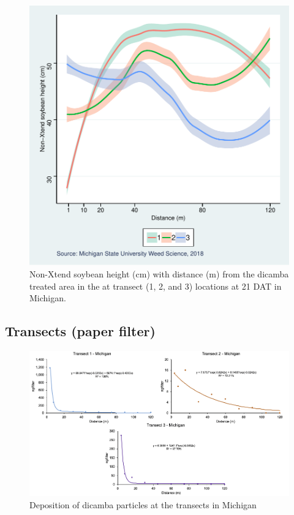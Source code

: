 \documentclass[]{article}
\begin{document}
\begin{figure}
\centering
\includegraphics{Report_files/figure-latex/unnamed-chunk-65-1.pdf}
\caption{Non-Xtend soybean height (cm) with distance (m) from the
dicamba treated area in the at transect (1, 2, and 3) locations at 21
DAT in Michigan.}
\end{figure}

\newpage

\pagebreak

\subsection{Transects (paper filter)}\label{transects-paper-filter-2}

\begin{figure}[h]

{\centering \includegraphics[width=1\linewidth]{MItransect} 

}

\caption{Deposition of dicamba particles at the transects in Michigan}\label{fig:unnamed-chunk-66}
\end{figure}
\end{document}
